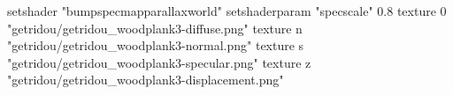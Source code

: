 setshader "bumpspecmapparallaxworld"
setshaderparam "specscale" 0.8
texture 0 "getridou/getridou_woodplank3-diffuse.png"
texture n "getridou/getridou_woodplank3-normal.png"
texture s "getridou/getridou_woodplank3-specular.png"
texture z "getridou/getridou_woodplank3-displacement.png"
